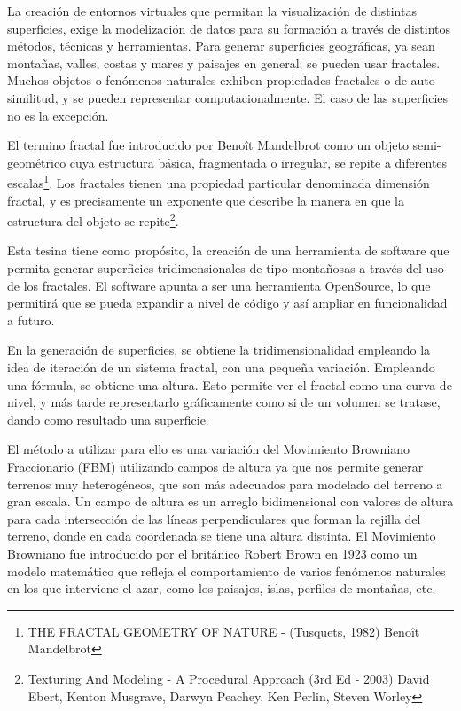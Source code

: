 \documentclass[12pt]{article} %
\begin{document}
La creación de entornos virtuales que permitan la visualización de distintas superficies, exige la modelización de datos para su formación a través de distintos métodos, técnicas y herramientas. Para generar superficies geográficas, ya sean montañas, valles, costas y mares y paisajes en general; se pueden usar fractales. Muchos objetos o fenómenos naturales exhiben propiedades fractales o de auto similitud, y se pueden representar computacionalmente. El caso de las superficies no es la excepción.

El termino fractal fue introducido por Benoît Mandelbrot como un objeto semi-geométrico cuya estructura básica, fragmentada o irregular, se repite a diferentes escalas\footnote{THE FRACTAL GEOMETRY OF NATURE - (Tusquets, 1982) Benoît Mandelbrot}. Los fractales tienen una propiedad particular denominada dimensión fractal, y es precisamente un exponente que describe la manera en que la estructura del objeto se repite\footnote{Texturing And Modeling - A Procedural Approach (3rd Ed - 2003) David Ebert, Kenton Musgrave, Darwyn Peachey, Ken Perlin, Steven Worley}.

Esta tesina tiene como propósito, la creación de una herramienta de software que permita generar superficies tridimensionales de tipo montañosas a través del uso de los fractales. El software apunta a ser una herramienta OpenSource, lo que permitirá que se pueda expandir a nivel de código y así ampliar en funcionalidad a futuro.

En la generación de superficies, se obtiene la tridimensionalidad empleando la idea de iteración de un sistema fractal, con una pequeña variación. Empleando una fórmula, se obtiene una altura. Esto permite ver el fractal como una curva de nivel, y más tarde representarlo gráficamente como si de un volumen se tratase, dando como resultado una superficie.

El método a utilizar para ello es una variación del Movimiento Browniano Fraccionario (FBM) utilizando campos de altura ya que nos permite generar terrenos muy heterogéneos, que son más adecuados para modelado del terreno a gran escala. Un campo de altura es un arreglo bidimensional con valores de altura para cada intersección de las líneas perpendiculares que forman la rejilla del terreno, donde en cada coordenada se tiene una altura distinta. El Movimiento Browniano fue introducido por el británico Robert Brown en 1923 como un modelo matemático que refleja el comportamiento de varios fenómenos naturales en los que interviene el azar, como los paisajes, islas, perfiles de montañas, etc.
\end{document}
